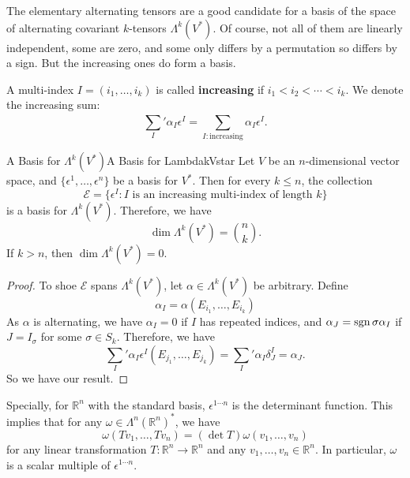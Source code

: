 \documentclass[../main.tex]{subfiles}
\begin{document}
The elementary alternating tensors are a good candidate for a basis of the space of alternating covariant $k$-tensors $\Lambda^k(V^*)$. Of course, not all of them are linearly independent, some are zero, and some only differs by a permutation so differs by a sign. But the increasing ones do form a basis.

A multi-index $I = (i_1, \dots, i_k)$ is called \textbf{increasing} if $i_1 < i_2 < \cdots < i_k$. We denote the increasing sum:
\begin{equation}
  \sum_{I}^{}' \alpha_I \epsilon^I = \sum_{I : \text{increasing}} \alpha_I \epsilon^I.
\end{equation}

\begin{proposition}{A Basis for $\Lambda^k(V^*)$}{A Basis for LambdakVstar}
  Let $V$ be an $n$-dimensional vector space, and $\{\epsilon^1, \dots, \epsilon^n\}$ be a basis for $V^*$. Then for every $k \leq n$, the collection
  \begin{equation}
    \mathcal{E} = \{\epsilon^I : I \text{ is an increasing multi-index of length $k$}\}
  \end{equation}
  is a basis for $\Lambda^k(V^*)$. Therefore, we have
  \begin{equation}
    \dim \Lambda^k(V^*) = \binom{n}{k}.
  \end{equation}
  If $k > n$, then $\dim \Lambda^k(V^*) = 0$.
\end{proposition}
\begin{proof}
  To shoe $\mathcal{E}$ spans $\Lambda^k(V^*)$, let $\alpha \in \Lambda^k(V^*)$ be arbitrary. Define
  \begin{equation*}
    \alpha_I = \alpha(E_{i_1}, \dots, E_{i_k})
  \end{equation*}
  As $\alpha$ is alternating, we have $\alpha_I = 0$ if $I$ has repeated indices, and $\alpha_J = \operatorname{sgn}\sigma \alpha_I$ if $J = I_\sigma$ for some $\sigma \in S_k$. Therefore, we have
  \begin{equation*}
    \sum_{I}^{}' \alpha_I \epsilon^I(E_{j_1}, \dots, E_{j_k}) = \sum_{I}^{}' \alpha_I \delta^I_J = \alpha_J.
  \end{equation*}
  So we have our result.
\end{proof}

Specially, for $\mathbb{R}^n$ with the standard basis, $\epsilon^{1 \cdots n}$ is the determinant function. This implies that for any $\omega\in \Lambda^n(\mathbb{R}^n)^*$, we have
\begin{equation*}
  \omega(Tv_1, \ldots , Tv_n) = (\det T) \omega(v_1, \ldots , v_n)
\end{equation*}
for any linear transformation $T : \mathbb{R}^n \to \mathbb{R}^n$ and any $v_1, \ldots , v_n \in \mathbb{R}^n$. In particular, $\omega$ is a scalar multiple of $\epsilon^{1 \cdots n}$.
\end{document}
